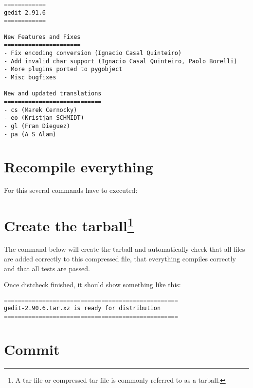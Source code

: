 \noindent{}

\begin{lstlisting}[style=plain]
============
gedit 2.91.6
============

New Features and Fixes
======================
- Fix encoding conversion (Ignacio Casal Quinteiro)
- Add invalid char support (Ignacio Casal Quinteiro, Paolo Borelli)
- More plugins ported to pygobject
- Misc bugfixes

New and updated translations
============================
- cs (Marek Cernocky)
- eo (Kristjan SCHMIDT)
- gl (Fran Dieguez)
- pa (A S Alam)
\end{lstlisting}

\section*{Recompile everything}

For this several commands have to executed:

\noindent{}

\noindent{}

\noindent{}

\newpage
\section*{Create the tarball\footnote{A tar file or compressed tar file is commonly referred to as a tarball.}}

The command below will create the tarball and automatically check that all files are added correctly to this compressed file, that everything compiles correctly and that all tests are passed.

\noindent{}

Once distcheck finished, it should show something like this:

\begin{lstlisting}[style=plain]
==================================================
gedit-2.90.6.tar.xz is ready for distribution
==================================================
\end{lstlisting}

\section*{Commit}

\noindent{}

